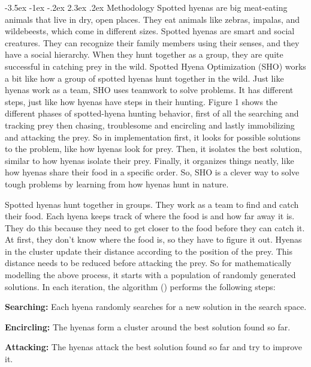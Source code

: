 \documentclass[12pt]{article}
\makeatletter
\renewcommand\section{\@startsection {section}{1}{1em}%
                                   {-3.5ex \@plus -1ex \@minus -.2ex}%
                                   {2.3ex \@plus.2ex}%
                                   {\normalfont\fontsize{14}{16}\bfseries}}
\makeatother
\begin{document}
 




\section{Methodology}
Spotted hyenas are big meat-eating animals that live in dry, open places. They eat animals like zebras, impalas, and wildebeests, which come in different sizes. Spotted hyenas are smart and social creatures. They can recognize their family members using their senses, and they have a social hierarchy. When they hunt together as a group, they are quite successful in catching prey in the wild. Spotted Hyena Optimization (SHO) works a bit like how a group of spotted hyenas hunt together in the wild. Just like hyenas work as a team, SHO uses teamwork to solve problems. 
It has different steps, just like how hyenas have steps in their hunting. Figure 1 shows the different phases of spotted-hyena hunting behavior, first of all the searching and tracking prey then chasing, troublesome and encircling and lastly immobilizing and attacking the prey.
So in implementation first, it looks for possible solutions to the problem, like how hyenas look for prey. 
Then, it isolates the best solution, similar to how hyenas isolate their prey. 
Finally, it organizes things neatly, like how hyenas share their food in a specific order. 
So, SHO is a clever way to solve tough problems by learning from how hyenas hunt in nature. 

Spotted hyenas hunt together in groups. They work as a team to find and catch their food. Each hyena keeps track of where the food is and how far away it is. They do this because they need to get closer to the food before they can catch it. At first, they don't know where the food is, so they have to figure it out. Hyenas in the cluster update their distance according to the position of  the prey. This distance needs to be reduced before attacking the prey. 
So for mathematically modelling the above process, it starts with a population of randomly generated solutions. In each iteration, the algorithm 
 (\cite{dhiman2017spotted,dhiman2018multi}) performs the following steps:

\textbf{Searching:} Each hyena randomly searches for a new solution in the search space.

\textbf{Encircling:} The hyenas form a cluster around the best solution found so far.

\textbf{Attacking:} The hyenas attack the best solution found so far and try to improve it.
\end{document}
